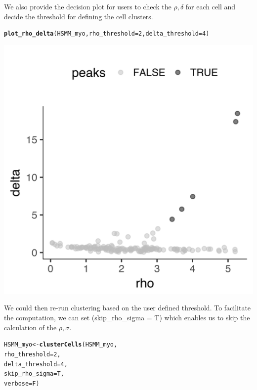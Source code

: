 \documentclass[10pt,oneside]{article}\usepackage[]{graphicx}\usepackage[]{color}
\makeatletter
\def\maxwidth{ %
  \ifdim\Gin@nat@width>\linewidth
    \linewidth
  \else
    \Gin@nat@width
  \fi
}
\newcommand{\hlnum}[1]{\textcolor[rgb]{0.686,0.059,0.569}{#1}}%
\newcommand{\hlstd}[1]{\textcolor[rgb]{0.345,0.345,0.345}{#1}}%
\newcommand{\hlkwb}[1]{\textcolor[rgb]{0.69,0.353,0.396}{#1}}%
\newcommand{\hlkwc}[1]{\textcolor[rgb]{0.333,0.667,0.333}{#1}}%
\newcommand{\hlkwd}[1]{\textcolor[rgb]{0.737,0.353,0.396}{\textbf{#1}}}%
\newenvironment{kframe}{%
 \def\at@end@of@kframe{}%
 \ifinner\ifhmode%
  \def\at@end@of@kframe{\end{minipage}}%
  \begin{minipage}{\columnwidth}%
 \fi\fi%
 \def\FrameCommand##1{\hskip\@totalleftmargin \hskip-\fboxsep
 \colorbox{shadecolor}{##1}\hskip-\fboxsep
     \hskip-\linewidth \hskip-\@totalleftmargin \hskip\columnwidth}%
 \MakeFramed {\advance\hsize-\width
   \@totalleftmargin\z@ \linewidth\hsize
   \@setminipage}}%
 {\par\unskip\endMakeFramed%
 \at@end@of@kframe}
\newenvironment{knitrout}{}{} %
\makeatother
\begin{document}
We also provide the decision plot for users to check the $\rho, \delta$ for each cell and decide the threshold for defining the cell clusters. 
\begin{knitrout}
\color{fgcolor}\begin{kframe}
\begin{alltt}
\hlkwd{plot_rho_delta}\hlstd{(HSMM_myo,} \hlkwc{rho_threshold} \hlstd{=} \hlnum{2}\hlstd{,} \hlkwc{delta_threshold} \hlstd{=} \hlnum{4} \hlstd{)}
\end{alltt}
\end{kframe}

{\centering \includegraphics[width=\maxwidth]{figure/plot_rho_delta-1} 

}



\end{knitrout}

We could then re-run clustering based on the user defined threshold. To 
facilitate the computation, we can set \Rfunction(skip\_rho\_sigma = T) 
which enables us to skip the calculation of the $\rho, \sigma$.  
\begin{knitrout}
\color{fgcolor}\begin{kframe}
\begin{alltt}
\hlstd{HSMM_myo} \hlkwb{<-} \hlkwd{clusterCells}\hlstd{(HSMM_myo,}
                         \hlkwc{rho_threshold} \hlstd{=} \hlnum{2}\hlstd{,}
                         \hlkwc{delta_threshold} \hlstd{=} \hlnum{4}\hlstd{,}
                         \hlkwc{skip_rho_sigma} \hlstd{= T,}
                         \hlkwc{verbose} \hlstd{= F)}
\end{alltt}
\end{kframe}
\end{knitrout}
\end{document}
